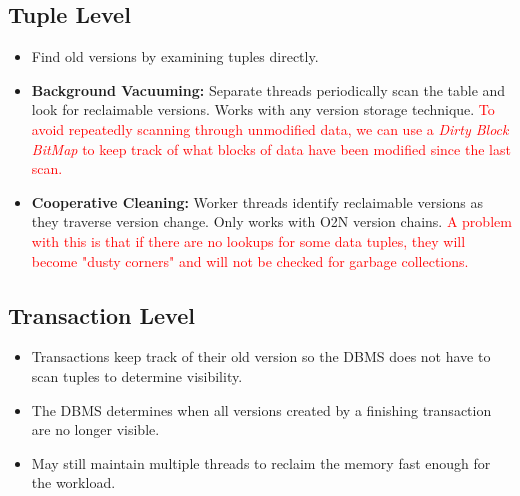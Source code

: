 \documentclass[11pt]{article}
\newcommand{\rr}[1]{\textcolor{red}{#1}}
\begin{document}
\subsection*{Tuple Level}
\begin{itemize}
    \item
    Find old versions by examining tuples directly.
    
    \item \textbf{Background Vacuuming:}
    Separate threads periodically scan the table and look for 
    reclaimable versions. Works with any version storage technique. \rr{To avoid repeatedly scanning through unmodified data, we can use a \textit{Dirty Block BitMap} to keep track of what blocks of data have been modified since the last scan.}
    
    \item \textbf{Cooperative Cleaning:}
    Worker threads identify reclaimable versions as they 
    traverse version change. Only works with O2N version chains. \rr{A problem with this is that if there are no lookups for some data tuples, they will become "dusty corners" and will not be checked for garbage collections.}
\end{itemize}

\subsection*{Transaction Level}
\begin{itemize}
    \item
    Transactions keep track of their old version so the DBMS does not have to scan tuples 
    to determine visibility.
    
    \item
    The DBMS determines when all versions created by a finishing transaction are no 
    longer visible.
    
    \item
    May still maintain multiple threads to reclaim the memory fast enough for the workload.
\end{itemize}

\end{document}
